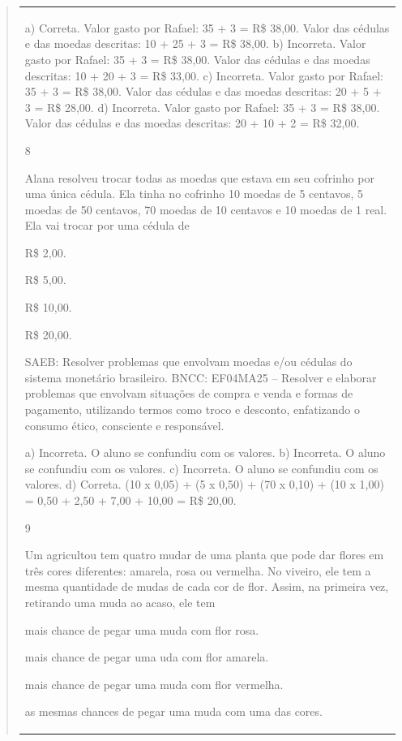 \begin{mdframed}[linewidth=2pt,linecolor=salmao,roundcorner=2pt]
\begin{itemize}
{\begin{itemize}
\begin{escolha}
{\begin{quote}
{\begin{escolha}
{{{{{\begin{longtable}[]{@{}l@{}}
\begin{itemize}
{a) Correta. Valor gasto por Rafael: 35 + 3 = R\$ 38,00. Valor das cédulas e das moedas descritas: 10 + 25 + 3 = R\$ 38,00.
b) Incorreta. Valor gasto por Rafael: 35 + 3 = R\$ 38,00. Valor das cédulas e das moedas descritas: 10 + 20 + 3 = R\$ 33,00.
c) Incorreta. Valor gasto por Rafael: 35 + 3 = R\$ 38,00. Valor das cédulas e das moedas descritas: 20 + 5 + 3 = R\$ 28,00.
d) Incorreta. Valor gasto por Rafael: 35 + 3 = R\$ 38,00. Valor das cédulas e das moedas descritas: 20 + 10 + 2 = R\$ 32,00.

\num{8}

Alana resolveu trocar todas as moedas que estava em seu cofrinho por uma
única cédula. Ela tinha no cofrinho 10 moedas de 5 centavos, 5 moedas de
50 centavos, 70 moedas de 10 centavos e 10 moedas de 1 real. Ela vai trocar por uma cédula de

\begin{escolha}
\item R\$ 2,00.
\item R\$ 5,00.
\item R\$ 10,00.
\item R\$ 20,00.

SAEB: Resolver problemas que envolvam moedas e/ou cédulas do
sistema monetário brasileiro.
BNCC: EF04MA25 -- Resolver e elaborar problemas que envolvam situações de compra e venda e formas
de pagamento, utilizando termos como troco e desconto, enfatizando o consumo ético, consciente e
responsável.

a) Incorreta. O aluno se confundiu com os valores.
b) Incorreta. O aluno se confundiu com os valores.
c) Incorreta. O aluno se confundiu com os valores.
d) Correta. (10 x 0,05) + (5 x 0,50) + (70 x 0,10) + (10 x 1,00) = 0,50 + 2,50 + 7,00 + 10,00 = R\$ 20,00.

\num{9}

Um agricultou tem quatro mudar de uma planta que pode dar flores em três cores diferentes: amarela, rosa ou vermelha. No viveiro, ele tem a mesma quantidade de mudas de cada cor de flor. Assim, na primeira vez, retirando uma muda ao acaso, ele tem

\begin{escolha}
\item mais chance de pegar uma muda com flor rosa.
\item mais chance de pegar uma uda com flor amarela.
\item mais chance de pegar uma muda com flor vermelha.
\item as mesmas chances de pegar uma muda com uma das cores.
\end{escolha}


\end{escolha}}
\end{itemize}
\end{longtable}}}}}}
\end{escolha}}
\end{quote}}
\end{escolha}
\end{itemize}}
\end{itemize}
\end{mdframed}
